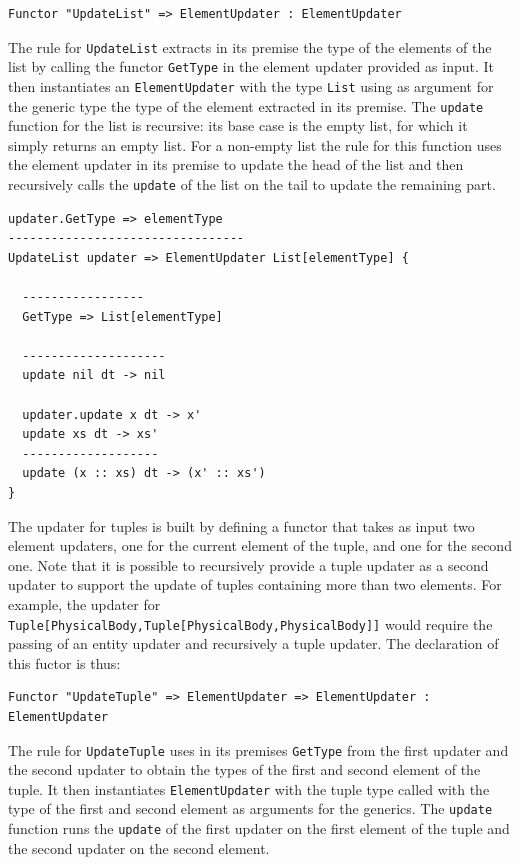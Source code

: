 \begin{lstlisting}
Functor "UpdateList" => ElementUpdater : ElementUpdater
\end{lstlisting}

\noindent
The rule for \texttt{UpdateList} extracts in its premise the type of the elements of the list by calling the functor \texttt{GetType} in the element updater provided as input. It then instantiates an \texttt{ElementUpdater} with the type \texttt{List} using as argument for the generic type the type of the element extracted in its premise. The \texttt{update} function for the list is recursive: its base case is the empty list, for which it simply returns an empty list. For a non-empty list the rule for this function uses the element updater in its premise to update the head of the list and then recursively calls the \texttt{update} of the list on the tail to update the remaining part.

\begin{lstlisting}
updater.GetType => elementType
---------------------------------
UpdateList updater => ElementUpdater List[elementType] {

  -----------------
  GetType => List[elementType]

  --------------------
  update nil dt -> nil

  updater.update x dt -> x'
  update xs dt -> xs'
  -------------------
  update (x :: xs) dt -> (x' :: xs')
}
\end{lstlisting}

\noindent
The updater for tuples is built by defining a functor that takes as input two element updaters, one for the current element of the tuple, and one for the second one. Note that it is possible to recursively provide a tuple updater as a second updater to support the update of tuples containing more than two elements. For example, the updater for \texttt{Tuple[PhysicalBody,Tuple[PhysicalBody,PhysicalBody]]} would require the passing of an entity updater and recursively a tuple updater. The declaration of this fuctor is thus:

\begin{lstlisting}
Functor "UpdateTuple" => ElementUpdater => ElementUpdater : ElementUpdater
\end{lstlisting}

\noindent
The rule for \texttt{UpdateTuple} uses in its premises \texttt{GetType} from the first updater and the second updater to obtain the types of the first and second element of the tuple. It then instantiates \texttt{ElementUpdater} with the tuple type called with the type of the first and second element as arguments for the generics. The \texttt{update} function runs the \texttt{update} of the first updater on the first element of the tuple and the second updater on the second element.

